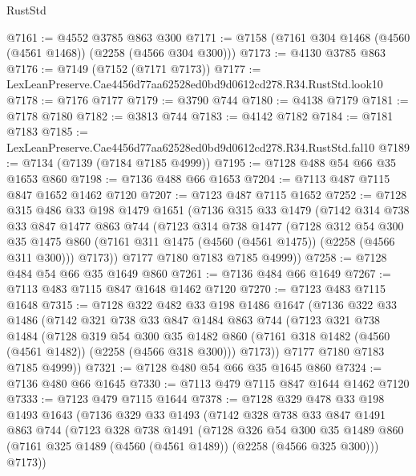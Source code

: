 \begin{lexlean}{RustStd}
\begin{coremodule}
@7161 := @4552 @3785 @863 @300
@7171 := @7158 (@7161 @304 @1468 (@4560 (@4561 @1468)) (@2258 (@4566 @304 @300)))
@7173 := @4130 @3785 @863
@7176 := @7149 (@7152 (@7171 @7173))
@7177 := LexLeanPreserve.Cae4456d77aa62528ed0bd9d0612cd278.R34.RustStd.look10
@7178 := @7176 @7177
@7179 := @3790 @744
@7180 := @4138 @7179
@7181 := @7178 @7180
@7182 := @3813 @744
@7183 := @4142 @7182
@7184 := @7181 @7183
@7185 := LexLeanPreserve.Cae4456d77aa62528ed0bd9d0612cd278.R34.RustStd.fal10
@7189 := @7134 (@7139 (@7184 @7185 @4999))
@7195 := @7128 @488 @54 @66 @35 @1653 @860
@7198 := @7136 @488 @66 @1653
@7204 := @7113 @487 @7115 @847 @1652 @1462 @7120
@7207 := @7123 @487 @7115 @1652
@7252 := @7128
    @315
    @486
    @33
    @198
    @1479
    @1651
    (@7136
      @315
      @33
      @1479
      (@7142
        @314
        @738
        @33
        @847
        @1477
        @863
        @744
        (@7123
          @314
          @738
          @1477
          (@7128
            @312
            @54
            @300
            @35
            @1475
            @860
            (@7161 @311 @1475 (@4560 (@4561 @1475)) (@2258 (@4566 @311 @300)))
            @7173))
        @7177
        @7180
        @7183
        @7185
        @4999))
@7258 := @7128 @484 @54 @66 @35 @1649 @860
@7261 := @7136 @484 @66 @1649
@7267 := @7113 @483 @7115 @847 @1648 @1462 @7120
@7270 := @7123 @483 @7115 @1648
@7315 := @7128
    @322
    @482
    @33
    @198
    @1486
    @1647
    (@7136
      @322
      @33
      @1486
      (@7142
        @321
        @738
        @33
        @847
        @1484
        @863
        @744
        (@7123
          @321
          @738
          @1484
          (@7128
            @319
            @54
            @300
            @35
            @1482
            @860
            (@7161 @318 @1482 (@4560 (@4561 @1482)) (@2258 (@4566 @318 @300)))
            @7173))
        @7177
        @7180
        @7183
        @7185
        @4999))
@7321 := @7128 @480 @54 @66 @35 @1645 @860
@7324 := @7136 @480 @66 @1645
@7330 := @7113 @479 @7115 @847 @1644 @1462 @7120
@7333 := @7123 @479 @7115 @1644
@7378 := @7128
    @329
    @478
    @33
    @198
    @1493
    @1643
    (@7136
      @329
      @33
      @1493
      (@7142
        @328
        @738
        @33
        @847
        @1491
        @863
        @744
        (@7123
          @328
          @738
          @1491
          (@7128
            @326
            @54
            @300
            @35
            @1489
            @860
            (@7161 @325 @1489 (@4560 (@4561 @1489)) (@2258 (@4566 @325 @300)))
            @7173))

\end{coremodule}
\end{lexlean}
